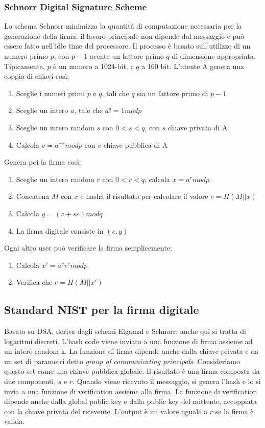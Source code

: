 \documentclass[11pt]{article}
\begin{document}
\subsubsection{Schnorr Digital Signature Scheme}
Lo schema Schnorr minimizza la quantità di computazione necessaria per la generazione della firma: il lavoro principale non dipende dal messaggio e può essere fatto nell'idle time del processore. Il processo è basato sull'utilizzo di un numero primo $p$, con $p-1$ avente un fattore primo $q$ di dimensione appropriata. Tipicamente, $p$ è un numero a 1024-bit, e $q$ a 160 bit.
L'utente A genera una coppia di chiavi così:
\begin{enumerate}
    \item Sceglie i numeri primi $p$ e $q$, tali che $q$ sia un fattore primo di $p-1$
    \item Sceglie un intero $a$, tale che $a^q= 1 mod p$
    \item Sceglie un intero random $s$ con $0<s<q$, con $s$ chiave privata di A
    \item Calcola $v=a^{-s} mod p$ con $v$ chiave pubblica di A
\end{enumerate}
Genera poi la firma così:
\begin{enumerate}
    \item Sceglie un intero random $r$ con $0<r<q$, calcola $x = a^r mod p$
    \item Concatena $M$ con $x$ e hasha il risultato per calcolare il valore $e = H(M || x)$
    \item Calcola $y = (r+se) mod q$
    \item La firma digitale consiste in $(e,y)$
\end{enumerate}
Ogni altro user può verificare la firma semplicemente:
\begin{enumerate}
    \item Calcola $x' = a^y v^e mod p$
    \item Verifica che $e=H(M || x')$
\end{enumerate}
\subsection{Standard NIST per la firma digitale}
Basato su DSA, deriva dagli schemi Elgamal e Schnorr: anche qui si tratta di logaritmi discreti. L'hash code viene inviato a una funzione di firma assieme ad un intero random k. La funzione di firma dipende anche dalla chiave privata e da un set di parametri detto \textit{group of communicating principals}. Consideriamo questo set come una chiave pubblica globale. Il risultato è una firma composta da due componenti, $s$ e $r$. Quando viene ricevuto il messaggio, si genera l'hash e lo si invia a una funzione di verification assieme alla firma. La funzione di verification dipende anche dalla global public key e dalla public key del mittente, accoppiata con la chiave privata del ricevente. L'output è un valore uguale a $r$ se la firma è valida. 
\end{document}

